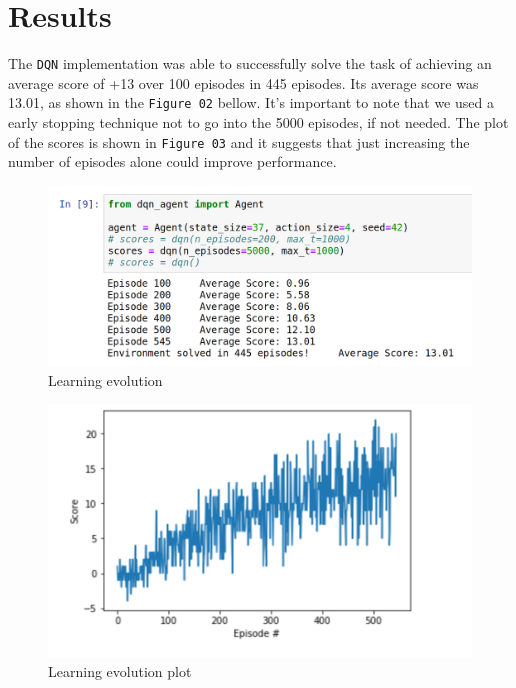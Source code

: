 \documentclass[
]{article}
\begin{document}
\pagebreak

\hypertarget{results}{%
\section{Results}\label{results}}

The \texttt{DQN} implementation was able to successfully solve the task
of achieving an average score of +13 over 100 episodes in 445 episodes.
Its average score was 13.01, as shown in the \texttt{Figure\ 02} bellow.
It's important to note that we used a early stopping technique not to go
into the 5000 episodes, if not needed. The plot of the scores is shown
in \texttt{Figure\ 03} and it suggests that just increasing the number
of episodes alone could improve performance.

\begin{figure}
\centering
\includegraphics{imgs/results_1.png}
\caption{Learning evolution}
\end{figure}

\begin{figure}
\centering
\includegraphics{imgs/results_2.png}
\caption{Learning evolution plot}
\end{figure}
\end{document}
